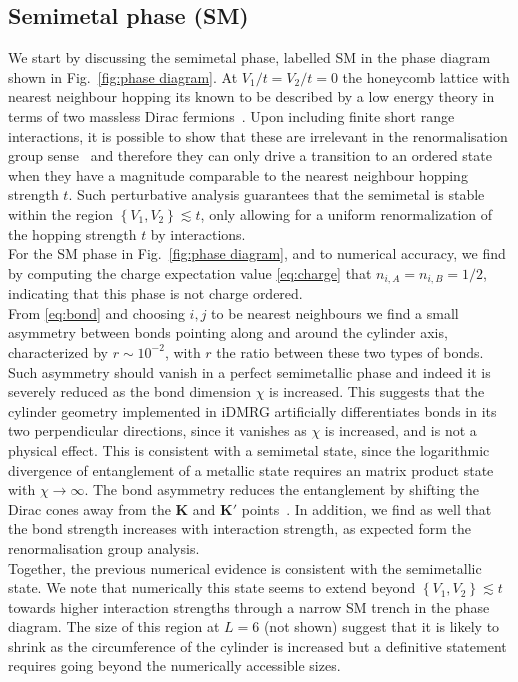 \documentclass[aps,prx,10pt,twocolumn,floatfix,superscriptaddress,showpacs,numerical,footinbib]{revtex4-1}
\begin{document}
%
\subsection{Semimetal phase (SM)}
%
We start by discussing the semimetal phase, labelled SM in the phase diagram shown in Fig.~\ref{fig:phase diagram}.
%
At $V_{1}/t=V_{2}/t=0$ the honeycomb lattice with nearest neighbour hopping its 
known to be described by a low energy theory in terms of two massless Dirac fermions~\cite{CastroNeto2009}.
%
Upon including finite short range interactions, it is possible to show that these are irrelevant in the renormalisation group sense~\cite{S94,KUP12} 
and therefore they can only drive a transition to an ordered state when they have a magnitude comparable to the nearest neighbour hopping strength $t$.
%
Such perturbative analysis guarantees that the semimetal is stable within
the region $\left\lbrace V_{1},V_{2}\right\rbrace \lesssim t$, only allowing for a uniform renormalization 
of the hopping strength $t$ by interactions.\\

%
For the SM phase in Fig.~\ref{fig:phase diagram}, and to numerical accuracy, we find by computing the charge expectation value
\eqref{eq:charge} that $n_{i,A}=n_{i,B}=1/2$, indicating that this phase is not charge ordered.\\
%
From \eqref{eq:bond} and choosing $i,j$ to be nearest neighbours we find
a small asymmetry between bonds pointing along and around the cylinder axis,
characterized by $r\sim10^{-2}$, with $r$ the ratio between these two types of bonds.
%
Such asymmetry should vanish in a perfect semimetallic phase and indeed it is severely reduced as the bond dimension $\chi$ is increased.
% 
This suggests that the cylinder geometry implemented in iDMRG artificially differentiates bonds in its two perpendicular directions,
since it vanishes as $\chi$ is increased, and is not a physical effect.
%
This is consistent with a semimetal state, since the logarithmic divergence of entanglement of a metallic state requires an matrix product state with $\chi\to\infty$. 
%
The bond asymmetry reduces the entanglement by shifting the Dirac cones away from the $\mathbf{K}$ and $\mathbf{K'}$ points~\cite{ACJ15}.
%
In addition, we find as well that the bond strength increases with interaction strength, as expected form the renormalisation group analysis. \\
%
Together, the previous numerical evidence is consistent with the semimetallic state.
%
We note that numerically this state seems to extend beyond $\left\lbrace V_{1},V_{2}\right\rbrace \lesssim t$ towards
higher interaction strengths through a narrow SM trench in the phase diagram.
%
The size of this region at $L=6$ (not shown) suggest that it is likely to shrink as the circumference of the cylinder is increased but
a definitive statement requires going beyond the numerically accessible sizes. 
%
\end{document}
